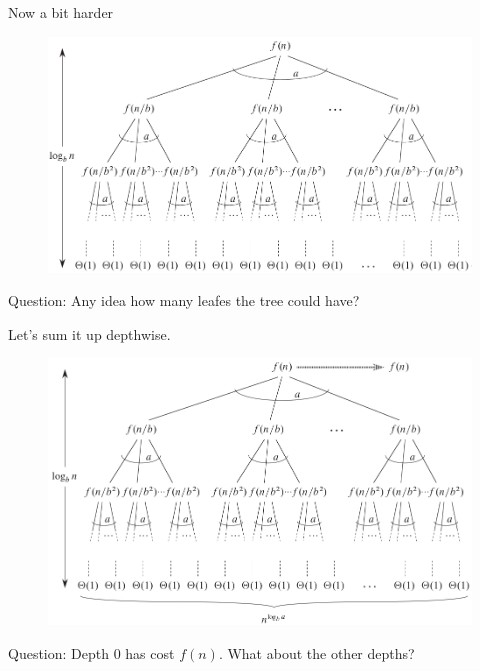 \documentclass[12pt]{beamer}
\begin{document}
\begin{frame}{Now a bit harder}
\begin{center}
\begin{figure}
\includegraphics[width=\textwidth]{tree1}
\end{figure}
\end{center}
Question: Any idea how many leafes the tree could have?
\end{frame}

%
\begin{frame}{Let's sum it up depthwise.}
\begin{center}
\begin{figure}
\includegraphics[width=\textwidth]{tree2}
\end{figure}
\end{center}
Question: Depth 0 has cost $f(n)$. What about the other depths?
\end{frame}
\end{document}
